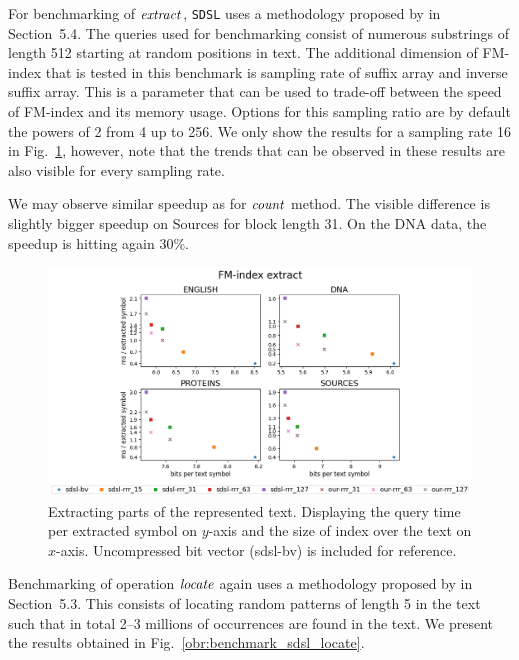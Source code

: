 For benchmarking of $\mathit{extract}$, \texttt{SDSL} uses a methodology proposed by
\cite{ferragina2009compressed} in Section~5.4. The queries used for benchmarking consist of
numerous substrings of length 512 starting at random positions in text. The additional dimension
of FM-index that is tested in this benchmark is sampling rate of suffix array and inverse suffix
array. This is a parameter that can be used to trade-off between the speed of FM-index and
its memory usage. Options for this sampling ratio are by default the powers of 2 from 4 up to
256. We only show the results for a sampling rate 16 in Fig.~\ref{obr:benchmark_sdsl_extract},
however, note that the trends that can be observed in these results are also visible for every
sampling rate.

We may observe similar speedup as for $\mathit{count}$ method. The visible difference is slightly
bigger speedup on Sources for block length 31. On the DNA data, the speedup is hitting again 30\%.

\begin{figure}
	\centerline{
		\includegraphics[width=\textwidth, height=0.4\textheight]{images/vysledky_sdsl_extract}
	}
	\caption[TODO]{Extracting parts of the represented text. Displaying
	the query time per extracted symbol on $y$-axis and the size of index over the text on $x$-axis.
	Uncompressed bit vector (sdsl-bv) is included for reference. 
	}
	\label{obr:benchmark_sdsl_extract}
\end{figure}

Benchmarking of operation $\mathit{locate}$ again uses a methodology proposed by \cite{ferragina2009compressed} 
in Section~5.3. This consists of locating random patterns of length 5 in the text such
that in total 2--3 millions of occurrences are found in the text. We present the results
obtained in Fig.~\ref{obr:benchmark_sdsl_locate}.

